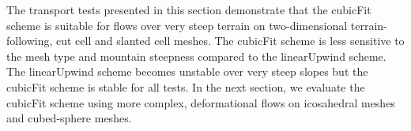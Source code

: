 The transport tests presented in this section demonstrate that the cubicFit scheme is suitable for flows over very steep terrain on two-dimensional terrain-following, cut cell and slanted cell meshes.  The cubicFit scheme is less sensitive to the mesh type and mountain steepness compared to the linearUpwind scheme.  The linearUpwind scheme becomes unstable over very steep slopes but the cubicFit scheme is stable for all tests.  In the next section, we evaluate the cubicFit scheme using more complex, deformational flows on icosahedral meshes and cubed-sphere meshes.

